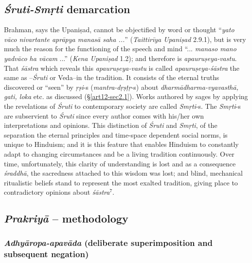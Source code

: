 \subsection{{{\sl\bfseries Śruti-Smṛti}\relax} demarcation}\label{art12-sec2.4}

Brahman, says the Upaniṣad, cannot be objectiﬁed by word or thought ``{\sl yato vāco nivartante aprāpya manasā saha ...}'' ({\sl Taittirīya Upaniṣad} 2.9.1), but is very much the reason for the functioning of the speech and mind ``... {\sl manaso mano yadvāco ha vācam} ...'' ({\sl Kena Upaniṣad} 1.2); and therefore is {\sl apauruṣeya-vastu}. That {\sl śāstra} which reveals this {\sl apauruṣeya-vastu} is called {\sl apauruṣeya-śāstra} the same as --{\sl Śruti} or Veda--in the tradition. It consists of the eternal truths discovered or ``seen'' by {\sl ṛṣi}-s ({\sl mantra-dṛṣṭṛ}-s) about {\sl dharmādharma-vyavasthā, gati, loka} etc. as discussed (\S\ref{art12-sec2.1}). Works authored by sages by applying the revelations of {\sl Śruti} to contemporary society are called {\sl Smṛti}-s. The {\sl Smṛti}-s are subservient to {\sl Śruti} since every author comes with his/her own interpretations and opinions. This distinction of {\sl Śruti}  and {\sl Smṛti}, of the separation the eternal principles and time-space dependent social norms, is unique to Hinduism; and it is this feature that enables Hinduism to constantly adapt to changing circumstances and be a living tradition continuously. Over time, unfortunately, this clarity of understanding is lost and as a consequence {\sl śraddhā}, the sacredness attached to this wisdom was lost; and blind, mechanical ritualistic beliefs stand to represent the most exalted tradition, giving place to contradictory opinions about {\sl śāstra}$^{7}$.

\subsection{{{\sl\bfseries Prakriyā}\relax} -- methodology}\label{art12-sec2.5}

\subsubsection{{{\sl\bfseries Adhyāropa-apavāda}\relax} (deliberate superimposition and subsequent negation)}\label{art12-sec2.5.1}

